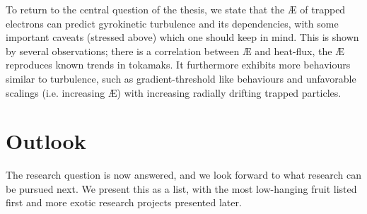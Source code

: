 To return to the central question of the thesis, we state that the \AE{} of trapped electrons can predict gyrokinetic turbulence and its dependencies, with some important caveats (stressed above) which one should keep in mind. This is shown by several observations; there is a correlation between \AE{} and heat-flux, the \AE{} reproduces known trends in tokamaks. It furthermore exhibits more behaviours similar to turbulence, such as gradient-threshold like behaviours and unfavorable scalings (i.e. increasing \AE{}) with increasing radially drifting trapped particles.

\section{Outlook}
The research question is now answered, and we look forward to what research can be pursued next. We present this as a list, with the most low-hanging fruit listed first and more exotic research projects presented later.
